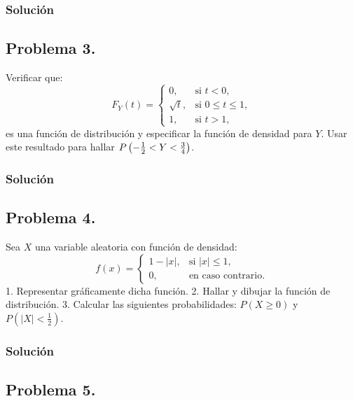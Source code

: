 \documentclass[
]{article}
\begin{document}
\hypertarget{soluciuxf3n-7}{%
\subsubsection{Solución}\label{soluciuxf3n-7}}

\hypertarget{problema-3.-1}{%
\subsection{Problema 3.}\label{problema-3.-1}}

Verificar que: \[
F_Y(t)=
\left\{\begin{array}{ll}
0, & \mbox{si $t<0$},\\
\sqrt{t}, & \mbox{si $0\leq t\leq 1$},\\ 1, &
\mbox{si $t>1$},
\end{array}\right.
\] es una función de distribución y especificar la función de densidad
para \(Y\). Usar este resultado para hallar
\(P\left(-{1\over 2}<Y<{3\over 4}\right)\).

\hypertarget{soluciuxf3n-8}{%
\subsubsection{Solución}\label{soluciuxf3n-8}}

\hypertarget{problema-4.-1}{%
\subsection{Problema 4.}\label{problema-4.-1}}

Sea \(X\) una variable aleatoria con función de densidad: \[
f(x)=\begin{cases}
1-|x|, & \mbox{si }|x|\leq 1,\\
0, & \mbox{en caso contrario.}
\end{cases}
\] 1. Representar gráficamente dicha función. 2. Hallar y dibujar la
función de distribución. 3. Calcular las siguientes probabilidades:
\(P(X\geq 0)\) y \(P\left(|X|<\frac{1}{2}\right).\)

\hypertarget{soluciuxf3n-9}{%
\subsubsection{Solución}\label{soluciuxf3n-9}}

\hypertarget{problema-5.-1}{%
\subsection{Problema 5.}\label{problema-5.-1}}
\end{document}
